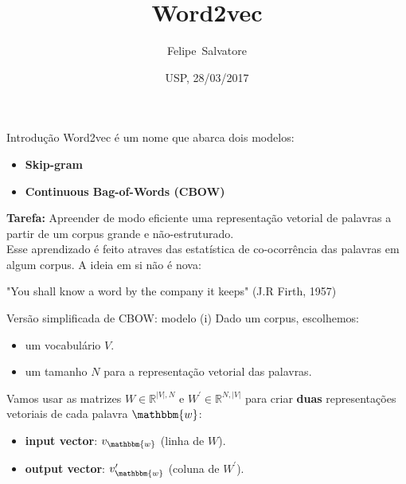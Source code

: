 \documentclass{beamer}
\title[Word2Vec] 
{Word2vec}
\author[F.Salvatore] 
{Felipe~Salvatore}
\date[USP 2015] 
{USP, 28/03/2017}
\newcommand{\wo}{\mathbbm{w}}
\begin{document}
\begin{frame}
\titlepage 
\end{frame}





\begin{frame}{Introdução}
Word2vec é um nome que abarca dois modelos:
\begin{itemize}
\item \textbf{Skip-gram}
\item \textbf{Continuous Bag-of-Words (CBOW)}
\end{itemize}

\vspace{0.1cm}
\textbf{Tarefa:} Apreender de modo eficiente uma representação vetorial de palavras a partir de um corpus grande e não-estruturado.\\

Esse aprendizado é feito atraves das estatística de co-ocorrência das palavras em algum corpus. A ideia em si não é nova:
\vspace{0.1cm}

\begin{center}
{\color{blue!89}"You shall know a word by the company it keeps" (J.R Firth, 1957)}
\end{center}
\end{frame}


\begin{frame}[fragile]{Versão simplificada de CBOW: modelo (i)}
Dado um corpus, escolhemos:
\begin{itemize}
\item um vocabulário $V$. 
\item um tamanho $N$ para a representação vetorial das palavras.
\end{itemize}
\vspace{0.1cm}
Vamos usar as matrizes $W \in \mathbb{R}^{|V|,N}$ e $W^{\prime} \in \mathbb{R}^{N,|V|}$ para criar \textbf{duas} representações vetoriais de cada palavra $\wo$:
\vspace{0.1cm}
\begin{itemize}
\item \textbf{input vector}: $v_\wo$  (linha de $W$).
\vspace{0.1cm}
\item \textbf{output vector}: $v^{\prime}_\wo$  (coluna de $W^{\prime}$).
\end{itemize}
\end{frame}
\end{document}
